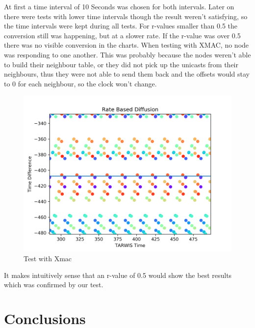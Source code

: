 \documentclass{llncs}
\begin{document}
At first a time interval of 10 Seconds was chosen for both intervals. Later on there were tests with lower time intervals though the result weren't satisfying,
so the time intervals were kept during all tests. 
For r-values smaller than 0.5 the conversion still was happening, but at a slower rate.
If the r-value was over 0.5 there was no visible conversion in the charts.
When testing with XMAC, no node was responding to one another. 
This was probably because the nodes weren't able to build their neighbour table, or they did not pick up the unicasts from their neighbours, thus they were not able to send them back and the offsets would stay to 0 for each neighbour, so the clock won't change.


\begin{figure}[H]
  \centering
  \includegraphics[width=\linewidth]{xmac.png}
  \caption{Test with Xmac}
  \label{fig:Test xmac}
\end{figure}

It makes intuitively sense that an r-value of 0.5 would show the best results which was confirmed by our test.

\section{Conclusions}
\end{document}
